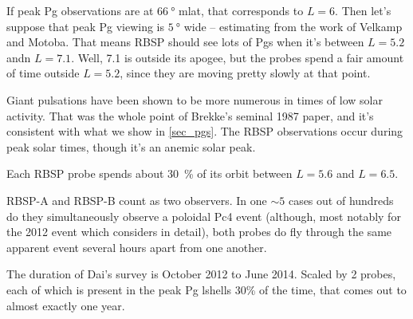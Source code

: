If peak Pg observations are at $\SI{66}{\degree}$ mlat, that corresponds to $L = 6$. Then let's suppose that peak Pg viewing is $\SI{5}{\degree}$ wide -- estimating from the work of Velkamp and Motoba. That means RBSP should see lots of Pgs when it's between $L = 5.2$ andn $L = 7.1$. Well, \SI{7.1}{\RE} is outside its apogee, but the probes spend a fair amount of time outside $L = 5.2$, since they are moving pretty slowly at that point. 

Giant pulsations have been shown to be more numerous in times of low solar activity. That was the whole point of Brekke's seminal 1987 paper, and it's consistent with what we show in \cref{sec_pgs}. The RBSP observations occur during peak solar times, though it's an anemic solar peak\cite{pesnell_2016}. 


Each RBSP probe spends about \SI{30}{\percent} of its orbit between $L = 5.6$ and $L = 6.5$. 

RBSP-A and RBSP-B count as two observers. In one $\sim 5$ cases out of hundreds do they simultaneously observe a poloidal Pc4 event (although, most notably for the 2012 event which \cite{dai_2013} considers in detail), both probes do fly through the same apparent event several hours apart from one another. 

The duration of Dai's survey is October 2012 to June 2014. Scaled by 2 probes, each of which is present in the peak Pg lshells 30\% of the time, that comes out to almost exactly one year. 









